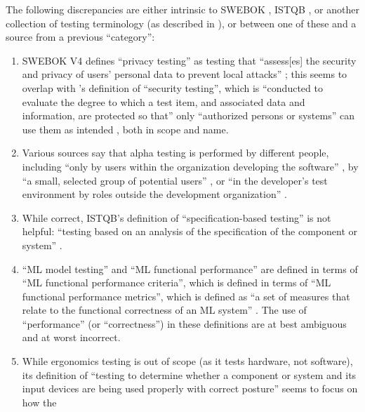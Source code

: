 The following discrepancies are either intrinsic to SWEBOK \citep{SWEBOK2024,
      SWEBOK2014}, ISTQB \citepISTQB{}, or another collection of testing
terminology \citep[so far only][]{Firesmith2015} (as described in
), or between one of these and a source from
a previous ``category'':

\begin{enumerate}[resume]
      \item SWEBOK V4 defines ``privacy testing'' as testing that ``assess[es]
            the security and privacy of users' personal data to prevent local
            attacks'' \citep[p.~5-10]{SWEBOK2024}; this seems to overlap with
            \citeauthor{IEEE2022}'s definition of ``security testing'', which is
            ``conducted to evaluate the degree to which a test item, and
            associated data and information, are protected so that'' only
            ``authorized persons or systems'' can use them as intended
            \citeyearpar[p.~9]{IEEE2022}, both in scope and name.
      \item Various sources say that alpha testing is performed by different
            people, including ``only by users within the organization
            developing the software'' \citep[p.~17]{IEEE2017}, by ``a small,
            selected group of potential users'' \citep[p.~5-8]{SWEBOK2024}, or
            ``in the developer's test environment by roles outside the
            development organization'' \citepISTQB{}.
      \item While correct, ISTQB's definition of ``specification-based testing''
            is not helpful: ``testing based on an analysis of the specification
            of the component or system'' \citepISTQB{}.
      \item ``ML model testing'' and ``ML functional performance'' are defined
            in terms of ``ML functional performance criteria'', which is defined
            in terms of ``ML functional performance metrics'', which is defined
            as ``a set of measures that relate to the functional correctness of
            an ML system'' \citepISTQB{}. The use of ``performance'' (or
            ``correctness'') in these definitions are at best ambiguous and at
            worst incorrect.
      \item While ergonomics testing is out of scope (as it tests hardware, not
            software), its definition of ``testing to determine whether a
            component or system and its input devices are being used properly
            with correct posture'' \citepISTQB{} seems to focus on how the

\end{enumerate}
